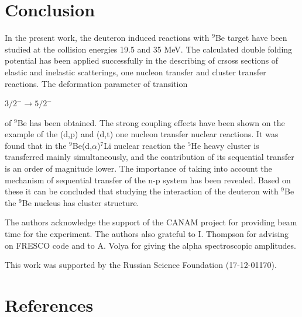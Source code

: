 \documentclass[10pt]{iopart}
\begin{document}
\section{Conclusion}
In the present work, the deuteron induced reactions with ${}^9$Be target have been studied at the collision energies 19.5 and 35 MeV.  
The calculated double folding potential has been applied successfully in the describing of crsoss sections of elastic and inelastic scatterings, one nucleon  transfer and cluster transfer reactions.
  The deformation parameter of transition \begin{small}
  $3/2^-\rightarrow5/2^-$
\end{small}  of ${}^9$Be has been obtained.
 The strong coupling effects have been shown on the example of the (d,p) and (d,t) one nucleon transfer nuclear reactions.
 It was found that  in the ${}^9$Be(d,$\alpha$)${}^7$Li nuclear reaction the ${}^5$He heavy cluster  is transferred mainly simultaneously, and the contribution of its sequential transfer is an order of magnitude lower.
 The importance of taking into account the mechanism of sequential transfer of the n-p system has been revealed.
 Based on these it can be concluded that studying the interaction of the  deuteron with  $^9$Be the $^9$Be  nucleus has cluster structure.


\ack
	The authors acknowledge the support of the CANAM project \cite{canam} for providing beam time for the experiment. The authors also grateful to I. Thompson for advising on FRESCO code and to A. Volya for giving the alpha spectroscopic amplitudes.

This work was supported by the Russian Science Foundation (17-12-01170).



\section*{References}



\end{document}
